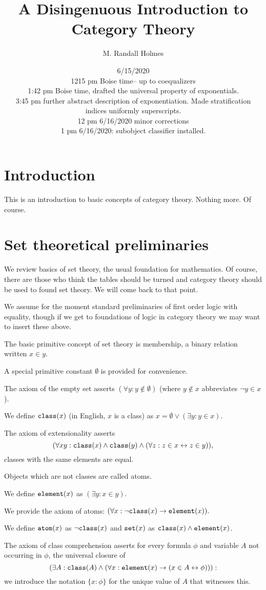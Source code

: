 \documentclass[12pt]{article}
\title{A Disingenuous Introduction to Category Theory}
\author{M. Randall Holmes}
\date{6/15/2020 \\ 1215 pm Boise time-- up to coequalizers \\ 1:42 pm Boise time, drafted the universal property of exponentials. \\ 3:45 pm further abstract description of exponentiation.  Made stratification indices uniformly superscripts.\\ 12 pm 6/16/2020 minor corrections \\ 1 pm 6/16/2020:  subobject classifier installed.}
\begin{document}
\maketitle

\section{Introduction}

This is an introduction to basic concepts of category theory.  Nothing more.  Of course.

\section{Set theoretical preliminaries}

We review basics of set theory, the usual foundation for mathematics.  Of course, there are those who think the tables should be turned and category theory should be used to found set theory.  We will come back to that point.

We assume for the moment standard preliminaries of first order logic with equality, though if we get to foundations of logic in category theory we may want to insert these above.

The basic primitive concept of set theory is membership, a binary relation written $x \in y$.

A special primitive constant $\emptyset$ is provided for convenience.  

The axiom of the empty set asserts $(\forall y: y \not\in \emptyset)$ (where $y \not\in x$ abbreviates $\neg y \in x$).

We define ${\tt class}(x)$ (in English, $x$ is a class) as $x = \emptyset \vee (\exists y: y \in x)$.

The axiom of extensionality asserts $$(\forall xy: {\tt class}(x) \wedge {\tt class}(y)  \wedge (\forall z:z \in x \leftrightarrow z \in y)),$$ classes with the same elements are equal.

Objects which are not classes are called atoms.

We define ${\tt element}(x)$ as $(\exists y:x \in y)$. 

We provide the axiom of atoms:  $(\forall x:\neg{\tt class}(x) \rightarrow {\tt element}(x)).$

We define ${\tt atom}(x)$ as $\neg{\tt class}(x)$ and ${\tt set}(x)$ as ${\tt class}(x) \wedge {\tt element}(x)$.

The axiom of class comprehension asserts for every formula $\phi$ and variable $A$ not occurring in $\phi$, the universal closure of $$(\exists A: {\tt class}(A) \wedge  (\forall x: {\tt element}(x) \rightarrow (x \in A \leftrightarrow \phi))):$$  we introduce the notation $\{x : \phi\}$ for the unique value of $A$ that witnesses this.
\end{document}
